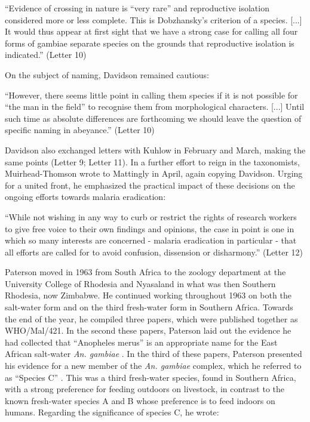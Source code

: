 \documentclass[a4paper,11pt,abstracton,hidelinks]{scrartcl}
\begin{document}
\begin{displayquote}
``Evidence of crossing in nature is ``very rare'' and reproductive isolation considered more or less complete. This is Dobzhansky's criterion of a species. [...] It would thus appear at first sight that we have a strong case for calling all four forms of gambiae separate species on the grounds that reproductive isolation is indicated.'' (Letter 10)
\end{displayquote}

On the subject of naming, Davidson remained cautious:

\begin{displayquote}
``However, there seems little point in calling them species if it is not possible for ``the man in the field'' to recognise them from morphological characters. [...] Until such time as absolute differences are forthcoming we should leave the question of specific naming in abeyance.'' (Letter 10)
\end{displayquote}


Davidson also exchanged letters with Kuhlow in February and March, making the same points (Letter 9; Letter 11). In a further effort to reign in the taxonomists, Muirhead-Thomson wrote to Mattingly in April, again copying Davidson. Urging for a united front, he emphasized the practical impact of these decisions on the ongoing efforts towards malaria eradication:


\begin{displayquote}
``While not wishing in any way to curb or restrict the rights of research workers to give free voice to their own findings and opinions, the case in point is one in which so many interests are concerned - malaria eradication in particular - that all efforts are called for to avoid confusion, dissension or disharmony.'' (Letter 12)
\end{displayquote}


Paterson moved in 1963 from South Africa to the zoology department at the University College of Rhodesia and Nyasaland in what was then Southern Rhodesia, now Zimbabwe. He continued working throughout 1963 on both the salt-water form and on the third fresh-water form in Southern Africa. Towards the end of the year, he compiled three papers, which were published together as WHO/Mal/421. In the second these papers, Paterson laid out the evidence he had collected that ``Anopheles merus'' is an appropriate name for the East African salt-water \textit{An. gambiae} \citep{Paterson1963a}. In the third of these papers, Paterson presented his evidence for a new member of the \textit{An. gambiae} complex, which he referred to as ``Species C'' \citep{Paterson1963b}. This was a third fresh-water species, found in Southern Africa, with a strong preference for feeding outdoors on livestock, in contrast to the known fresh-water species A and B whose preference is to feed indoors on humans. Regarding the significance of species C, he wrote:
\end{document}

